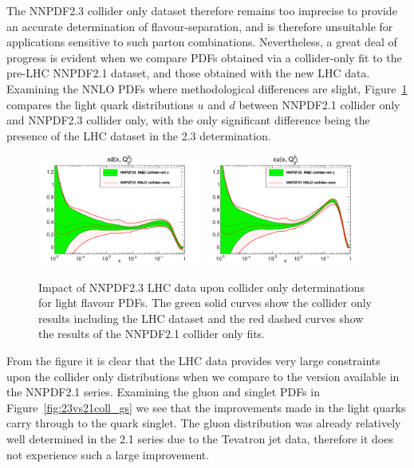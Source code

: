 The NNPDF2.3 collider only dataset therefore remains too imprecise to provide an accurate determination of flavour-separation, and is therefore unsuitable for applications sensitive to such parton combinations. Nevertheless, a great deal of progress is evident when we compare PDFs obtained via a collider-only fit to the pre-LHC NNPDF2.1 dataset, and those obtained with the new LHC data. Examining the NNLO PDFs where methodological differences are slight, Figure~\ref{fig:23vs21coll_lqs} compares the light quark distributions $u$ and $d$ between NNPDF2.1 collider only and NNPDF2.3 collider only, with the only significant difference being the presence of the LHC dataset in the 2.3 determination.


\begin{figure}[h]
\centering
\includegraphics[width=0.48\textwidth]{6-LHCimpact/figs/pdf_xd_log_band_comparison.pdf}
\includegraphics[width=0.48\textwidth]{6-LHCimpact/figs/pdf_xu_log_band_comparison.pdf}
\caption[Impact of NNPDF2.3 LHC data upon collider only determinations for light flavour PDFs]{Impact of NNPDF2.3 LHC data upon collider only determinations for light flavour PDFs. The green solid curves show the collider only results including the LHC dataset and the red dashed curves show the results of the NNPDF2.1 collider only fits.}
\label{fig:23vs21coll_lqs}
\end{figure}

From the figure it is clear that the LHC data provides very large constraints upon the collider only distributions when we compare to the version available in the NNPDF2.1 series. Examining the gluon and singlet PDFs in Figure~\ref{fig:23vs21coll_gs} we see that the improvements made in the light quarks carry through to the quark singlet. The gluon distribution was already relatively well determined in the 2.1 series due to the Tevatron jet data, therefore it does not experience such a large improvement. 

